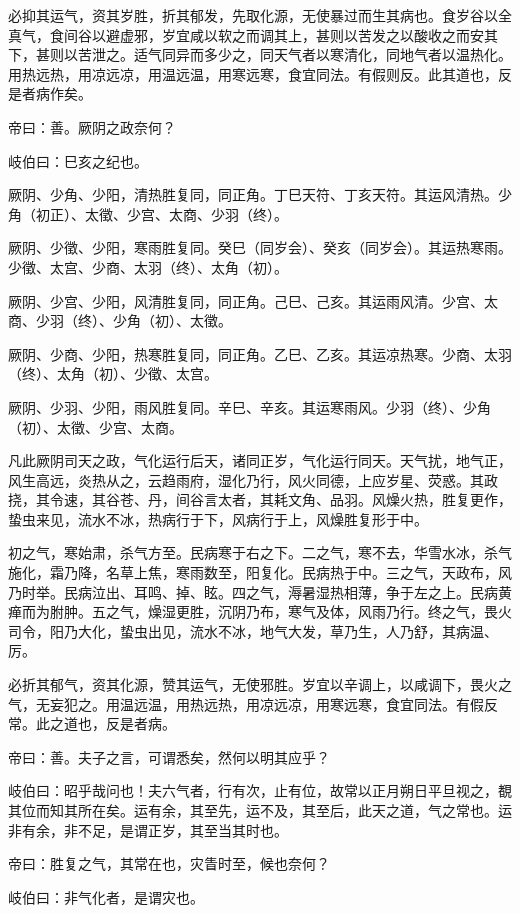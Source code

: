 \documentclass{article}%
\begin{document}
必抑其运气，资其岁胜，折其郁发，先取化源，无使暴过而生其病也。食岁谷以全真气，食间谷以避虚邪，岁宜咸以软之而调其上，甚则以苦发之以酸收之而安其下，甚则以苦泄之。适气同异而多少之，同天气者以寒清化，同地气者以温热化。用热远热，用凉远凉，用温远温，用寒远寒，食宜同法。有假则反。此其道也，反是者病作矣。

帝曰：善。厥阴之政奈何？

岐伯曰：巳亥之纪也。

厥阴、少角、少阳，清热胜复同，同正角。丁巳天符、丁亥天符。其运风清热。少角（初正）、太徵、少宫、太商、少羽（终）。

厥阴、少徵、少阳，寒雨胜复同。癸巳（同岁会）、癸亥（同岁会）。其运热寒雨。少徵、太宫、少商、太羽（终）、太角（初）。

厥阴、少宫、少阳，风清胜复同，同正角。己巳、己亥。其运雨风清。少宫、太商、少羽（终）、少角（初）、太徵。

厥阴、少商、少阳，热寒胜复同，同正角。乙巳、乙亥。其运凉热寒。少商、太羽（终）、太角（初）、少徵、太宫。

厥阴、少羽、少阳，雨风胜复同。辛巳、辛亥。其运寒雨风。少羽（终）、少角（初）、太徵、少宫、太商。

凡此厥阴司天之政，气化运行后天，诸同正岁，气化运行同天。天气扰，地气正，风生高远，炎热从之，云趋雨府，湿化乃行，风火同德，上应岁星、荧惑。其政挠，其令速，其谷苍、丹，间谷言太者，其耗文角、品羽。风燥火热，胜复更作，蛰虫来见，流水不冰，热病行于下，风病行于上，风燥胜复形于中。

初之气，寒始肃，杀气方至。民病寒于右之下。二之气，寒不去，华雪水冰，杀气施化，霜乃降，名草上焦，寒雨数至，阳复化。民病热于中。三之气，天政布，风乃时举。民病泣出、耳鸣、掉、眩。四之气，溽暑湿热相薄，争于左之上。民病黄瘅而为胕肿。五之气，燥湿更胜，沉阴乃布，寒气及体，风雨乃行。终之气，畏火司令，阳乃大化，蛰虫出见，流水不冰，地气大发，草乃生，人乃舒，其病温、厉。

必折其郁气，资其化源，赞其运气，无使邪胜。岁宜以辛调上，以咸调下，畏火之气，无妄犯之。用温远温，用热远热，用凉远凉，用寒远寒，食宜同法。有假反常。此之道也，反是者病。

帝曰：善。夫子之言，可谓悉矣，然何以明其应乎？

岐伯曰：昭乎哉问也！夫六气者，行有次，止有位，故常以正月朔日平旦视之，覩其位而知其所在矣。运有余，其至先，运不及，其至后，此天之道，气之常也。运非有余，非不足，是谓正岁，其至当其时也。

帝曰：胜复之气，其常在也，灾眚时至，候也奈何？

岐伯曰：非气化者，是谓灾也。
\end{document}
